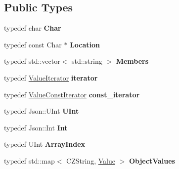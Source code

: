 \subsection*{Public Types}
\begin{DoxyCompactItemize}
\item 
\hypertarget{protocol_json_1_1_j_s_o_n___a_p_i_aaa40995a01a083f11fdb518ab1546366}{typedef char {\bfseries Char}}\label{protocol_json_1_1_j_s_o_n___a_p_i_aaa40995a01a083f11fdb518ab1546366}

\item 
\hypertarget{protocol_json_1_1_j_s_o_n___a_p_i_ac78c2a0788236409a83cd3fbb15cc27e}{typedef const Char $\ast$ {\bfseries Location}}\label{protocol_json_1_1_j_s_o_n___a_p_i_ac78c2a0788236409a83cd3fbb15cc27e}

\item 
\hypertarget{protocol_json_1_1_j_s_o_n___a_p_i_a69a83395b9a01ee28dbc5026a322ad56}{typedef std\-::vector$<$ std\-::string $>$ {\bfseries Members}}\label{protocol_json_1_1_j_s_o_n___a_p_i_a69a83395b9a01ee28dbc5026a322ad56}

\item 
\hypertarget{protocol_json_1_1_j_s_o_n___a_p_i_a682f4e1bbed287f1ab85ee0912d68b3e}{typedef \hyperlink{class_json_1_1_value_iterator}{Value\-Iterator} {\bfseries iterator}}\label{protocol_json_1_1_j_s_o_n___a_p_i_a682f4e1bbed287f1ab85ee0912d68b3e}

\item 
\hypertarget{protocol_json_1_1_j_s_o_n___a_p_i_a8f629afe15b29cf656d532bb9b4509e4}{typedef \hyperlink{class_json_1_1_value_const_iterator}{Value\-Const\-Iterator} {\bfseries const\-\_\-iterator}}\label{protocol_json_1_1_j_s_o_n___a_p_i_a8f629afe15b29cf656d532bb9b4509e4}

\item 
\hypertarget{protocol_json_1_1_j_s_o_n___a_p_i_a065237d47a9dffbf14ad04842ff50586}{typedef Json\-::\-U\-Int {\bfseries U\-Int}}\label{protocol_json_1_1_j_s_o_n___a_p_i_a065237d47a9dffbf14ad04842ff50586}

\item 
\hypertarget{protocol_json_1_1_j_s_o_n___a_p_i_abed1de75991fb8d5afe4a4854def6293}{typedef Json\-::\-Int {\bfseries Int}}\label{protocol_json_1_1_j_s_o_n___a_p_i_abed1de75991fb8d5afe4a4854def6293}

\item 
\hypertarget{protocol_json_1_1_j_s_o_n___a_p_i_ad35740d876f51395815a4fa8a353859f}{typedef U\-Int {\bfseries Array\-Index}}\label{protocol_json_1_1_j_s_o_n___a_p_i_ad35740d876f51395815a4fa8a353859f}

\item 
\hypertarget{protocol_json_1_1_j_s_o_n___a_p_i_a10657a8f9bc6f360dae4016fe8cc7650}{typedef std\-::map$<$ C\-Z\-String, \hyperlink{protocol_json_1_1_j_s_o_n___a_p_i_a3a85c4423131080eb9300546d6130dfd}{Value} $>$ {\bfseries Object\-Values}}\label{protocol_json_1_1_j_s_o_n___a_p_i_a10657a8f9bc6f360dae4016fe8cc7650}

\end{DoxyCompactItemize}
